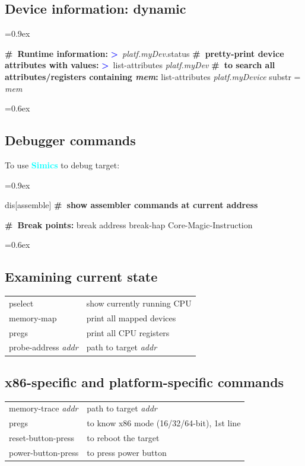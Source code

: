 \documentclass[8pt]{extarticle}
\newenvironment{code}[1][]{%
\begin{prebox}[#1]\obeylines%
\fontdimen2\font=0.9ex%
}{%
\end{prebox}%
\fontdimen2\font=0.6ex%
}
\newcommand{\sprompt}{\textcolor{blue}{\textbf{>}\ }}
\newcommand{\cmtcommon}[1]{\textcolor{Sepia}{\textbf{#1}}}
\newcommand{\cmt}[1]{\cmtcommon{\#\ #1}}
\newcommand{\p}[1]{\textit{\large#1}}
\newcommand{\Simics}{\textcolor{cyan}{\textbf{Simics}}}
\begin{document}
\begin{multicols*}{3}
\subsection{Device information: dynamic}

\begin{code}
    \cmt{Runtime information:}
    \sprompt \p{platf.myDev}.status
    \cmt{pretty-print device attributes with values:}
    \sprompt list-attributes \p{platf.myDev}
    \cmt{to search all attributes/registers containing \p{mem}:}
    list-attributes \p{platf.myDevice} substr = \p{mem}
\end{code}


\subsection{Debugger commands}
To use \Simics{} to debug target:
\begin{code}
dis[assemble] \cmt{show assembler commands at current address}

\cmt{Break points:}
break address
break-hap Core-Magic-Instruction
\end{code}

\subsection{Examining current state}

\noindent\begin{tabular}{ll}
    pselect & show currently running CPU \\
    memory-map & print all mapped devices \\
    pregs & print all CPU registers \\
    probe-address \p{addr} & path to target \p{addr}
\end{tabular}

\subsection{x86-specific and platform-specific commands}

\noindent\begin{tabular}{ll}
    memory-trace \p{addr} & path to target \p{addr} \\
    pregs & to know x86 mode (16/32/64-bit), 1st line \\
    reset-button-press & to reboot the target \\
    power-button-press & to press power button \\
\end{tabular}


\end{multicols*}
\end{document}
